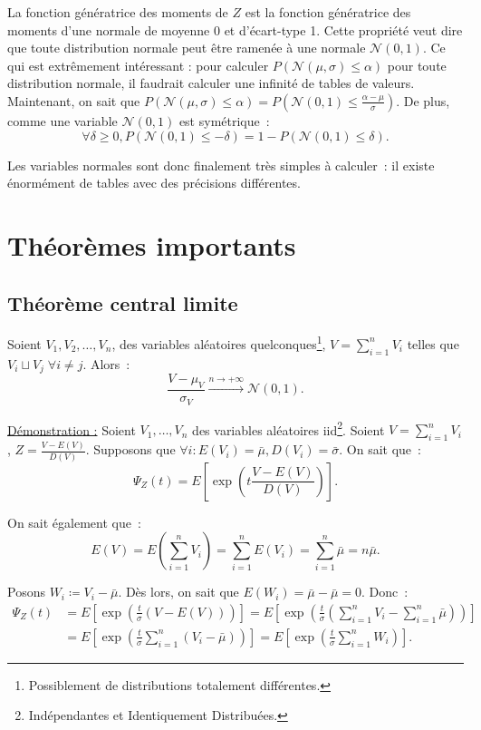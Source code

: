 \documentclass{article}
\newcommand{\Nms}{{\mathcal N(\mu, \sigma)}}
\newcommand{\Nzo}{\mathcal N(0, 1)}
\begin{document}
			La fonction génératrice des moments de $Z$ est la fonction génératrice des moments d'une normale de moyenne 0 et d'écart-type 1. Cette propriété veut dire
			que toute distribution normale peut être ramenée à une normale $\Nzo$. Ce qui est extrêmement intéressant : pour calculer $P(\Nms \leq \alpha)$ pour toute
			distribution normale, il faudrait calculer une infinité de tables de valeurs. Maintenant, on sait que
			$P(\Nms \leq \alpha) = P(\Nzo \leq \frac {\alpha - \mu}\sigma)$. De plus, comme une variable $\Nzo$ est symétrique~:
			\[\forall \delta \geq 0, P(\Nzo \leq -\delta) = 1 - P(\Nzo \leq \delta).\]

			Les variables normales sont donc finalement très simples à calculer~: il existe énormément de tables avec des précisions différentes.

\section{Théorèmes importants}
	\subsection{Théorème central limite}
		Soient $V_1, V_2, \ldots, V_n$, des variables aléatoires quelconques\footnote{Possiblement de distributions totalement différentes.}, $V = \sum_{i=1}^nV_i$
		telles que $V_i \sqcup V_j \; \forall i \neq j$. Alors~:
		\[\frac {V - \mu_V}{\sigma_V} \stackrel{n \to +\infty}{\longrightarrow} \Nzo.\]

		\underline{Démonstration :} Soient $V_1, \ldots, V_n$ des variables aléatoires iid\footnote{Indépendantes et Identiquement Distribuées.}. Soient
		$V = \sum_{i=1}^nV_i$, $Z = \frac {V - E(V)}{D(V)}$. Supposons que $\forall i : E(V_i) = \bar \mu, D(V_i) = \bar \sigma$. On sait que~:
		\[\Psi_Z(t) = E\left[\exp\left(t\frac {V-E(V)}{D(V)}\right)\right].\]

		On sait également que~:
		\[E(V) = E\left(\sum_{i=1}^nV_i\right) = \sum_{i=1}^nE(V_i) = \sum_{i=1}^n\bar \mu = n\bar \mu.\]

		Posons $W_i \coloneqq V_i - \bar \mu$. Dès lors, on sait que $E(W_i) = \bar \mu - \bar \mu = 0$. Donc~:
		\begin{align*}
			\Psi_Z(t) &= E\left[ \exp\left(\frac t\sigma(V-E(V))\right) \right]
				= E\left[ \exp\left(\frac t\sigma \left(\sum_{i=1}^nV_i - \sum_{i=1}^n\bar\mu\right)\right) \right] \\
			&= E\left[ \exp\left(\frac t\sigma \sum_{i=1}^n(V_i-\bar\mu)\right) \right] = E\left[ \exp\left(\frac t\sigma\sum_{i=1}^nW_i\right) \right].
		\end{align*}
\end{document}
